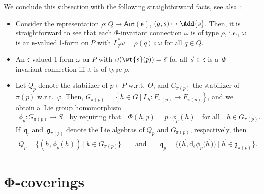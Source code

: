 We conclude this subsection with the following straightforward facts, see also~\cite{Wang}:
\begin{itemize}\itemsep=0pt
\item
Consider the representation $\rho\colon Q \rightarrow \mathsf{Aut}(\mathfrak{s})$, $(g,s)\mapsto \Add{s}$.
Then, it is straightforward to see that each $\Phi$-invariant connection $\omega$ is of type $\rho$, i.e., $\omega$ is an
$\mathfrak{s}$-valued 1-form on $P$ with $L_{q}^{*}\omega=\rho(q)\circ \omega$ for all $q\in Q$.
\item
An $\mathfrak{s}$-valued 1-form $\omega$ on $P$ with $\omega(\wt{s}(p))=\vec{s}$ for all $\vec{s}\in
\mathfrak{s}$ is a~$\Phi$-invariant connection if\/f it is of type $\rho$.
\item
Let $Q_{p}$ denote the stabilizer of $p\in P$ w.r.t.~$\Theta$, and $G_{\pi(p)}$ the stabilizer of
$\pi(p)$ w.r.t.~$\varphi$.
Then, $G_{\pi(p)}=\left\{h\in G\: | \:L_h\colon F_{\pi(p)}\rightarrow F_{\pi(p)} \right\}$, and we obtain a~Lie group homomorphism
\begin{gather*}
 \phi_p\colon G_{\pi(p)}\rightarrow S\quad\text{by requiring that}\quad \Phi(h,p)=p\cdot\phi_p(h)\quad\text{for all}\quad h\in
G_{\pi(p)}.
\end{gather*}
If~$\mathfrak{q}_p$ and~$\mathfrak{g}_{\pi(p)}$ denote the Lie algebras of $Q_p$ and $G_{\pi(p)}$, respectively, then
\begin{gather}
\label{eq:staoQ}
Q_p=\{(h,\phi_p(h))\:|\:h\in G_{\pi(p)}\}
\qquad
\text{and}
\qquad
\mathfrak{q}_p=\big\{\big(\vec{h},
\mathrm{d}_e\phi_p\big(\vec{h}\hspace{1pt}\big)\big)\:\big|\:\vec{h}\in
\mathfrak{g}_{\pi(p)}\big\}.
\end{gather}
\end{itemize}


\section[$\Phi$-coverings]{$\boldsymbol{\Phi}$-coverings}\label{sec:phiCoverings}

